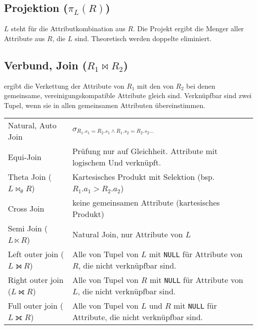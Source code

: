 \subsection{Projektion ($\pi_L (R)$)}
$L$ steht für die Attributkombination aus $R$. Die Projekt ergibt die Menger aller Attribute aus $R$, die $L$ sind.
Theoretisch werden doppelte eliminiert.

\subsection{Verbund, Join ($R_1 \Join R_2$)}
ergibt die Verkettung der Attribute von $R_1$ mit den von $R_2$ bei denen gemeinsame, vereinigungskompatible Attribute gleich sind.
Verknüpfbar sind zwei Tupel, wenn sie in allen gemeinsamen Attributen übereinstimmen.
\settowidth{\MyLenA}{Right outer join ($L \fullouterjoin R$)~~}
\begin{tabular}{
	@{}p{\the\MyLenA}%
	@{}p{\linewidth-\the\MyLenA}}
	Natural, Auto Join & $\sigma_{R_1.s_1 = R_2.s_1 \wedge R_1.s_2 = R_2.s_2 \dots}$\\
	Equi-Join & Prüfung nur auf Gleichheit. Attribute mit logischem Und verknüpft.\\
	Theta Join ($L \Join _\theta R $) & Kartesisches Produkt mit Selektion (bsp. $R_1.a_1 > R_2.a_2$)\\
	Cross Join & keine gemeinsamen Attribute (kartesisches Produkt)\\
	Semi Join ($L \ltimes R$) & Natural Join, nur Attribute von $L$\\
	Left outer join ($L \leftouterjoin R$) & Alle von Tupel von $L$ mit \texttt{NULL} für Attribute von $R$, die nicht verknüpfbar sind.\\
	Right outer join ($L \rightouterjoin R$) & Alle von Tupel von $R$ mit \texttt{NULL} für Attribute von $L$, die nicht verknüpfbar sind.\\
	Full outer join ($L \fullouterjoin R$) & Alle von Tupel von $L$ und $R$ mit \texttt{NULL} für Attribute, die nicht verknüpfbar sind.\\  
\end{tabular}




